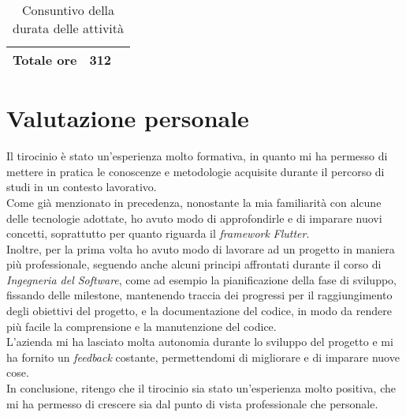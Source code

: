 \begin{table}
\begin{tabularx}{\textwidth}{|c|c|X|}
        \textbf{Totale ore} & \multicolumn{1}{|X|}{\textbf{312}} \\ 
        \hline
        
    \end{tabularx}
    \caption{Consuntivo della durata delle attività}
    \label{tab:consultivo-ore}
\end{table}

\section{Valutazione personale}
\label{sec:valutazione-personale}

Il tirocinio è stato un'esperienza molto formativa, in quanto mi ha permesso di mettere in pratica le conoscenze e metodologie acquisite durante il percorso di studi in un contesto lavorativo.\\
Come già menzionato in precedenza, nonostante la mia familiarità con alcune delle tecnologie adottate, ho avuto modo di approfondirle e di imparare nuovi concetti, soprattutto per quanto riguarda il \emph{framework} \emph{Flutter}.\\
Inoltre, per la prima volta ho avuto modo di lavorare ad un progetto in maniera più professionale, seguendo anche alcuni principi affrontati durante il corso di \emph{Ingegneria del Software}, come ad esempio la pianificazione della fase di sviluppo, fissando delle \gls{milestone}\glsoccur, mantenendo traccia dei progressi per il raggiungimento degli obiettivi del progetto, e la documentazione del codice, in modo da rendere più facile la comprensione e la manutenzione del codice.\\  
L'azienda mi ha lasciato molta autonomia durante lo sviluppo del progetto e mi ha fornito un \emph{feedback} costante, permettendomi di migliorare e di imparare nuove cose. \\
In conclusione, ritengo che il tirocinio sia stato un'esperienza molto positiva, che mi ha permesso di crescere sia dal punto di vista professionale che personale.